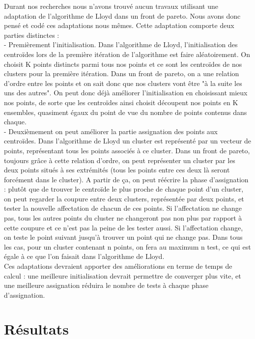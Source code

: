 ﻿\documentclass{meta}
\begin{document}
{Durant nos recherches nous n'avons trouvé aucun travaux utilisant une adaptation de l'algorithme de Lloyd dans un front de pareto. Nous avons donc pensé et codé ces adaptations nous mêmes.
Cette adaptation comporte deux parties distinctes :\\
- Premièrement l'initialisation. Dans l'algorithme de Lloyd, l'initialisation des centroïdes lors de la première itération de l'algorithme est faire aléatoirement. On choisit K points distincts parmi tous nos points et ce sont les centroïdes de nos clusters pour la première itération. Dans un front de pareto, on a une relation d'ordre entre les points et on sait donc que nos clusters vont être "à la suite les uns des autres". On peut donc déjà améliorer l'initialisation en choisissant mieux nos points, de sorte que les centroïdes ainsi choisit découpent nos points en K ensembles, quasiment égaux du point de vue du nombre de points contenus dans chaque.\\
- Deuxièmement on peut améliorer la partie assignation des points aux centroïdes. Dans l'algorithme de Lloyd un cluster est représenté par un vecteur de points, représentant tous les points associés à ce cluster. Dans un front de pareto, toujours grâce à cette relation d'ordre, on peut représenter un cluster par les deux points situés à ses extrémités (tous les points entre ces deux là seront forcément dans le cluster). A partir de ça, on peut réécrire la phase d'assignation : plutôt que de trouver le centroïde le plus proche de chaque point d'un cluster, on peut regarder la coupure entre deux clusters, représentée par deux points, et tester la nouvelle affectation de chacun de ces points. Si l'affectation ne change pas, tous les autres points du cluster ne changeront pas non plus par rapport à cette coupure et ce n'est pas la peine de les tester aussi. Si l'affectation change, on teste le point suivant jusqu'à trouver un point qui ne change pas. Dans tous les cas, pour un cluster contenant n points, on fera au maximum n test, ce qui est égale à ce que l'on faisait dans l'algorithme de Lloyd.\\
Ces adaptations devraient apporter des améliorations en terme de temps de calcul : une meilleure initialisation devrait permettre de converger plus vite, et une meilleure assignation réduira le nombre de tests à chaque phase d'assignation.

\newpage
\section{Résultats}

}
\end{document}
